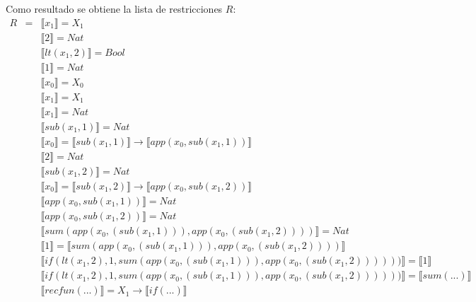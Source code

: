 \begin{exercise}
\begin{description}
           \item Como resultado se obtiene la lista de restricciones $R$:
            \[
                \begin{array}{rclr}
                R&=&  \llbracket x_1 \rrbracket = X_1  \\
                &&  \llbracket 2 \rrbracket = Nat\\
                &&  \llbracket lt(x_1 , 2) \rrbracket = Bool\\
                &&  \llbracket 1 \rrbracket = Nat\\
                &&  \llbracket x_0 \rrbracket = X_0 \\
                &&  \llbracket x_1 \rrbracket = X_1 \\
                &&  \llbracket x_1 \rrbracket = Nat\\
                &&  \llbracket sub(x_1,1) \rrbracket = Nat \\
                &&  \llbracket x_0 \rrbracket =  \llbracket sub(x_1,1) \rrbracket \to  \llbracket app(x_0, sub(x_1,1)) \rrbracket\\
                &&  \llbracket 2 \rrbracket = Nat \\
                &&  \llbracket sub(x_1,2) \rrbracket = Nat \\
                &&  \llbracket x_0 \rrbracket =  \llbracket sub(x_1,2) \rrbracket \to  \llbracket app(x_0, sub(x_1,2)) \rrbracket \\
                &&  \llbracket app(x_0, sub(x_1,1)) \rrbracket = Nat \\
                &&  \llbracket app(x_0, sub(x_1,2)) \rrbracket = Nat \\	
	      &&   \llbracket sum(app(x_0, (sub(x_1,1))), app(x_0, (sub(x_1,2))))  \rrbracket = Nat \\
                &&  \llbracket 1 \rrbracket =  \llbracket sum(app(x_0, (sub(x_1,1))), app(x_0, (sub(x_1,2)))) \rrbracket \\
                &&  \llbracket if(lt(x_1 , 2), 1, sum(app(x_0, (sub(x_1,1))), app(x_0, (sub(x_1,2)))))) \rrbracket =  \llbracket 1 \rrbracket\\
                &&  \llbracket if(lt(x_1 , 2), 1, sum(app(x_0, (sub(x_1,1))), app(x_0, (sub(x_1,2)))))) \rrbracket =  \llbracket sum(...)  \rrbracket \\
                &&  \llbracket recfun(...) \rrbracket =   X_1  \to  \llbracket if(...) \rrbracket \\
                \end{array}
            \]


\end{description}
\end{exercise}
